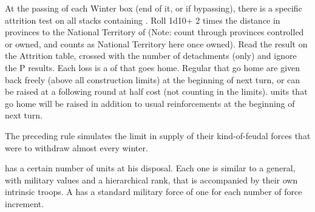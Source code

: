 


\label{chSpecific:Turkey:Yearly Campaigning}
At the passing of each Winter box (end of it, or if bypassing), there
is a specific attrition test on all stacks containing \Timar.
\bparag Roll 1d10+ 2 times the distance in provinces to the National
Territory of \TUR (Note: count through provinces controlled or owned,
 and  counts as National Territory here once
owned).
\bparag Read the result on the Attrition table, crossed with the number
of \Timar detachments (only) and ignore the P results.
\bparag Each loss is a \LD of \Timar that goes home.  Regular \Timar \LD
that go home are given back freely (above all construction limits) at
the beginning of next turn, or can be raised at a following round at
half cost (not counting in the limits).  \Pasha units that go home will
be raised in addition to usual reinforcements at the beginning of next
turn.

\begin{designnote}
  The preceding rule simulates the limit in supply of their
  kind-of-feudal forces that were to withdraw almost every winter.
\end{designnote}

\aparag[Pashas]\label{chSpecific:Turkey:Pashas}
\TUR has a certain number of \Pasha units at his disposal.  Each one
is similar to a general, with military values and a hierarchical rank,
that is accompanied by their own intrinsic troops. A \Pasha has a
standard military force of one \Timar \LD for each number of force
increment.

